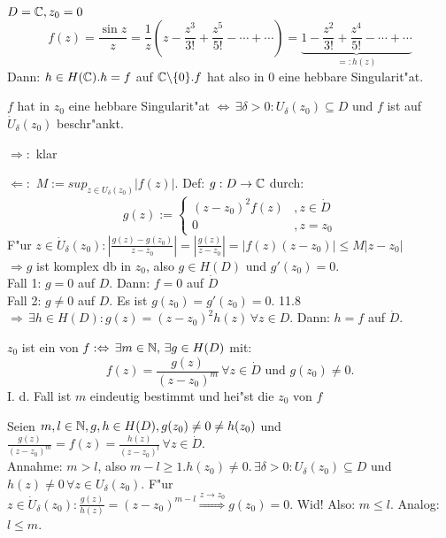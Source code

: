 \documentclass[a4paper,twoside,DIV15,BCOR12mm]{scrbook}
\begin{document}
\begin{beispiel}
$D=\mathbb{C}, z_0=0$
\[
f(z) = \frac{\sin z}{z} = \frac1z\left(z - \frac{z^3}{3!} + \frac{z^5}{5!} - \cdots + \cdots \right) = \underbrace{1 - \frac{z^2}{3!} + \frac{z^4}{5!} - \cdots + \cdots}_{=:h(z)}
\]
Dann: $h \in H(\mathbb{C}). h=f$ auf $\mathbb{C} \backslash\{0\}. f$ hat also in $0$ eine hebbare Singularit"at.
\end{beispiel}

\begin{satz}
$f$ hat in $z_0$ eine hebbare Singularit"at $\Leftrightarrow \, \exists \delta > 0: U_{\delta}(z_0) \subseteq D$ und $f$ ist auf $\dot U_{\delta}(z_0)$ beschr"ankt.
\end{satz}

\begin{beweis}
\item[$\Rightarrow:$] klar
\item[$\Leftarrow:$] $M:=sup_{z \in U_{\delta}(z_0)} |f(z)|$. Def: $g: D \rightarrow \mathbb{C}$ durch:
\[
g(z) := \begin{cases} (z-z_0)^2f(z) &, z \in \dot{D} \\
0 &, z=z_0 \end{cases}
\]
F"ur $z \in \dot{U}_{\delta}(z_0): \left| \frac{g(z)-g(z_0)}{z-z_0} \right| = \left| \frac{g(z)}{z-z_0} \right| = |f(z)(z-z_0)| \leq M|z-z_0|$\\
$\Rightarrow g$ ist komplex db in $z_0$, also $g \in H(D)$ und $g'(z_0) = 0$.\\
Fall 1: $g = 0$ auf $D$. Dann: $f=0$ auf $\dot{D}$\\
Fall 2: $g \not= 0$ auf $D$. Es ist $g(z_0) = g'(z_0) = 0.$ 11.8 $\Rightarrow \, \exists h \in H(D): g(z) = (z-z_0)^2 h(z) \, \forall z \in D.$ Dann: $h=f$ auf $\dot{D}$.
\end{beweis}

\begin{satz}
$z_0$ ist ein  von $f : \Leftrightarrow \,\exists m \in \mathbb{N}, \, \exists g \in H(D)$ mit:
\[
f(z) = \frac{g(z)}{(z-z_0)^m} \, \forall z \in \dot{D} \mbox{ und } g(z_0) \not= 0.
\]
I. d. Fall ist $m$ eindeutig bestimmt und hei"st die  $z_0$ von $f$
\end{satz}

\begin{beweis}
Seien $m,l \in \mathbb{N}, g,h \in H(D), g(z_0) \not= 0 \not= h(z_0)$ und $\frac{g(z)}{(z-z_0)^m} = f(z) = \frac{h(z)}{(z-z_0)^l} \, \forall z \in \dot{D}.$\\
Annahme: $m > l$, also $m-l \geq 1. h(z_0) \not= 0. \, \exists \delta > 0: U_{\delta}(z_0) \subseteq D$ und $h(z) \not= 0 \, \forall z \in U_{\delta}(z_0).$ F"ur $z \in \dot{U}_{\delta}(z_0): \frac{g(z)}{h(z)} = (z-z_0)^{m-l} \stackrel{z \rightarrow z_0}{\Rightarrow} g(z_0) = 0$. Wid! Also: $m \leq l$. Analog: $l \leq m$.
\end{beweis}
\end{document}
